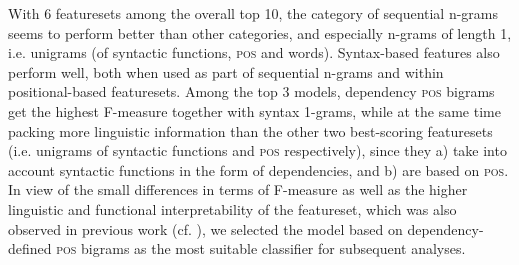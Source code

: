 \documentclass[output=paper]{langscibook}
\begin{document}
With 6 featuresets among the overall top 10, the category of sequential n-grams seems to perform better than other categories, and especially n-grams of length 1, i.e. unigrams (of syntactic functions, \textsc{pos} and words). Syntax-based features also perform well, both when used as part of sequential n-grams and within positional-based featuresets. Among the top 3 models, dependency \textsc{pos} bigrams get the highest F-measure together with syntax 1-grams, while at the same time packing more linguistic information than the other two best-scoring featuresets (i.e. unigrams of syntactic functions and \textsc{pos} respectively), since they a) take into account syntactic functions in the form of dependencies, and b) are based on \textsc{pos}. In view of the small differences in terms of F-measure as well as the higher linguistic and functional interpretability of the featureset, which was also observed in previous work (cf. ), we selected the model based on dependency-defined \textsc{pos} bigrams as the most suitable classifier for subsequent analyses.
\end{document}
